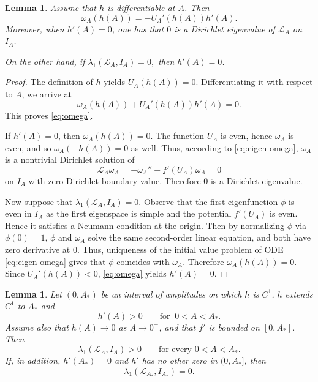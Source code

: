 \documentclass[reqno,12pt]{amsart}
\numberwithin{equation}{section}
\newtheorem{lemma}[theorem]{Lemma}
\theoremstyle{remark}
\begin{document}
\begin{lemma} \label{lem:zero-eigenvalue}
Assume that $h$ is differentiable at $A$.  Then
\begin{equation}\label{eq:omega}
    \omega_A(h(A))=-U_A'(h(A))h'(A).
\end{equation}
Moreover, when  $h'(A)=0$, one has that $0$ is a Dirichlet eigenvalue of $\mathcal L_A$ on $I_A$.  

On the other hand, if $\lambda_1(\mathcal L_A,I_A)=0,$
then $h'(A)=0$.
\end{lemma}

\begin{proof}
The definition of $h$ yields $U_A(h(A))=0.$
Differentiating it with respect to $A$, we arrive at
$$
\omega_A(h(A))+U_A'(h(A))h'(A)=0.
$$
This proves \eqref{eq:omega}.

If $h'(A)=0$, then $\omega_A(h(A))=0$.  The function $U_A$ is even, hence
$\omega_A$ is even, and so $\omega_A(-h(A))=0$ as well.  Thus, according to \eqref{eq:eigen-omega}, $\omega_A$ is a
nontrivial Dirichlet solution of
$$
\mathcal L_A \omega_A= -\omega_A''-f'(U_A)\omega_A=0
$$
on $I_A$ with zero Dirichlet boundary value.  Therefore $0$ is a Dirichlet eigenvalue.

Now suppose that $\lambda_1(\mathcal L_A,I_A)=0$.  Observe that the first eigenfunction $\phi$ is even in $I_A$ as  the first eigenspace is simple and the potential $f'(U_A)$ is even.  Hence it satisfies a Neumann condition at the origin.  Then by normalizing $\phi$  via $\phi(0)=1$,  $\phi$  and $\omega_A$ solve the same second-order linear equation, and both have zero derivative at $0$.  Thus, uniqueness of the initial value problem of ODE \eqref{eq:eigen-omega} gives that  $\phi$ coincides with $\omega_A$.  Therefore $\omega_A(h(A))=0$.  Since $U_A'(h(A))<0$, \eqref{eq:omega} yields $h'(A)=0$.
\end{proof}

\begin{lemma} \label{lem:lower-branch-stability}
Let $(0,A_*)$ be an interval of amplitudes on which $h$ is $C^1$, $h$ extends $C^1$ to $A_*$ and
$$
h'(A)>0\qquad\text{for } \ 0<A<A_*.
$$
Assume also that $h(A)\to0$ as $A\to 0^+$, and that $f'$ is bounded on
$[0,A_*]$.  Then
$$
\lambda_1(\mathcal L_A,I_A)>0
\qquad\text{for every }0<A<A_*.
$$
If, in addition, $h'(A_*)=0$ and $h'$ has no other zero in $(0,A_*]$, then
$$
\lambda_1(\mathcal L_{A_*},I_{A_*})=0.
$$
\end{lemma}
\end{document}
